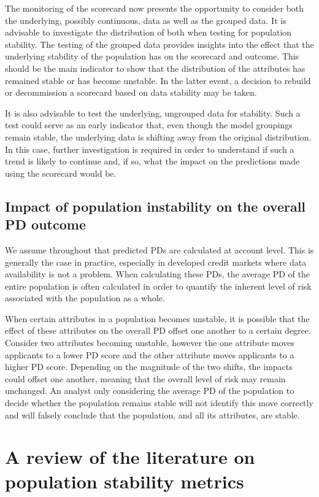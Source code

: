 \documentclass{article}
\theoremstyle{def}
\begin{document}
The monitoring of the scorecard now presents the opportunity to consider both the underlying, possibly continuous, data as well as the grouped data. It is advisable to investigate the distribution of both when testing for population stability. The testing of the grouped data provides insights into the effect that the underlying stability of the population has on the scorecard and outcome. This should be the main indicator to show that the distribution of the attributes has remained stable or has become unstable. In the latter event, a decision to rebuild or decommission a scorecard based on data stability may be taken.

It is also advisable to test the underlying, ungrouped data for stability. Such a test could serve as an early indicator that, even though the model groupings remain stable, the underlying data is shifting away from the original distribution. In this case, further investigation is required in order to understand if such a trend is likely to continue and, if so, what the impact on the predictions made using the scorecard would be.

\subsection{Impact of population instability on the overall PD outcome}

We assume throughout that predicted PDs are calculated at account level. This is generally the case in practice, especially in developed credit markets where data availability is not a problem. When calculating these PDs, the average PD of the entire population is often calculated in order to quantify the inherent level of risk associated with the population as a whole.

When certain attributes in a population becomes unstable, it is possible that the effect of these attributes on the overall PD offset one another to a certain degree. Consider two attributes becoming unstable, however the one attribute moves applicants to a lower PD score and the other attribute moves applicants to a higher PD score. Depending on the magnitude of the two shifts, the impacts could offset one another, meaning that the overall level of risk may remain unchanged. An analyst only considering the average PD of the population to decide whether the population remains stable will not identify this move correctly and will falsely conclude that the population, and all its attributes, are stable.

\section{A review of the literature on population stability metrics}\label{PSMs}
\end{document}
